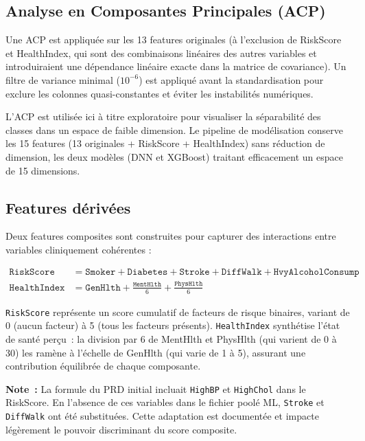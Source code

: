 \subsection{Analyse en Composantes Principales (ACP)}

Une ACP est appliquée sur les 13 features originales (à l'exclusion de RiskScore et HealthIndex, qui sont des combinaisons linéaires des autres variables et introduiraient une dépendance linéaire exacte dans la matrice de covariance). Un filtre de variance minimal ($10^{-6}$) est appliqué avant la standardisation pour exclure les colonnes quasi-constantes et éviter les instabilités numériques.

L'ACP est utilisée ici à titre exploratoire pour visualiser la séparabilité des classes dans un espace de faible dimension. Le pipeline de modélisation conserve les 15 features (13 originales + RiskScore + HealthIndex) sans réduction de dimension, les deux modèles (DNN et XGBoost) traitant efficacement un espace de 15 dimensions.

\subsection{Features dérivées}

Deux features composites sont construites pour capturer des interactions entre variables cliniquement cohérentes :

\begin{align}
    \texttt{RiskScore} &= \texttt{Smoker} + \texttt{Diabetes} + \texttt{Stroke} + \texttt{DiffWalk} + \texttt{HvyAlcoholConsump} \label{eq:riskscore} \\
    \texttt{HealthIndex} &= \texttt{GenHlth} + \frac{\texttt{MentHlth}}{6} + \frac{\texttt{PhysHlth}}{6} \label{eq:healthindex}
\end{align}

\texttt{RiskScore} représente un score cumulatif de facteurs de risque binaires, variant de 0 (aucun facteur) à 5 (tous les facteurs présents). \texttt{HealthIndex} synthétise l'état de santé perçu~: la division par 6 de MentHlth et PhysHlth (qui varient de 0 à 30) les ramène à l'échelle de GenHlth (qui varie de 1 à 5), assurant une contribution équilibrée de chaque composante.

\textbf{Note~:} La formule du PRD initial incluait \texttt{HighBP} et \texttt{HighChol} dans le RiskScore. En l'absence de ces variables dans le fichier poolé ML, \texttt{Stroke} et \texttt{DiffWalk} ont été substituées. Cette adaptation est documentée et impacte légèrement le pouvoir discriminant du score composite.

